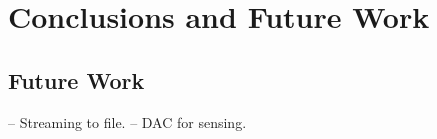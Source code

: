 \section{Conclusions and Future Work}

\subsection{Future Work}
-- Streaming to file.
-- DAC for sensing.
